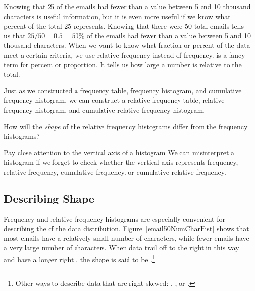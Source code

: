 Knowing that 25 of the emails had fewer than a value between 5 and 10 thousand characters is useful information, but it is even more useful if we know what percent of the total 25 represents. Knowing that there were 50 total emails tells us that $25 / 50 = 0.5 = 50\%$ of the emails had fewer than a value between 5 and 10 thousand characters. When we want to know what fraction or percent of the data meet a certain criteria, we use relative frequency instead of frequency.  is a fancy term for percent or proportion. It tells us how large a number is relative to the total.

Just as we constructed a frequency table, frequency histogram, and cumulative frequency histogram, we can construct a relative frequency table, relative frequency histogram, and cumulative relative frequency histogram.

\begin{exercisewrap}
\begin{nexercise}
How will the \emph{shape} of the relative frequency histograms differ from the frequency histograms?\footnotemark
\end{nexercise}
\end{exercisewrap}

\begin{onebox}{Pay close attention to the vertical axis of a histogram}
{We can misinterpret a histogram if we forget to check whether the vertical axis represents frequency, relative frequency, cumulative frequency, or cumulative relative frequency.}
\end{onebox}




\subsection{Describing Shape}
\label{shape}

Frequency and relative frequency histograms are especially convenient for describing the  of the data distribution\label{shapeFirstDiscussed}. Figure~\ref{email50NumCharHist} shows that most emails have a relatively small number of characters, while fewer emails have a very large number of characters. When data trail off to the right in this way and have a longer right , the shape is said to be .\footnote{Other ways to describe data that are right skewed: , , or .}

